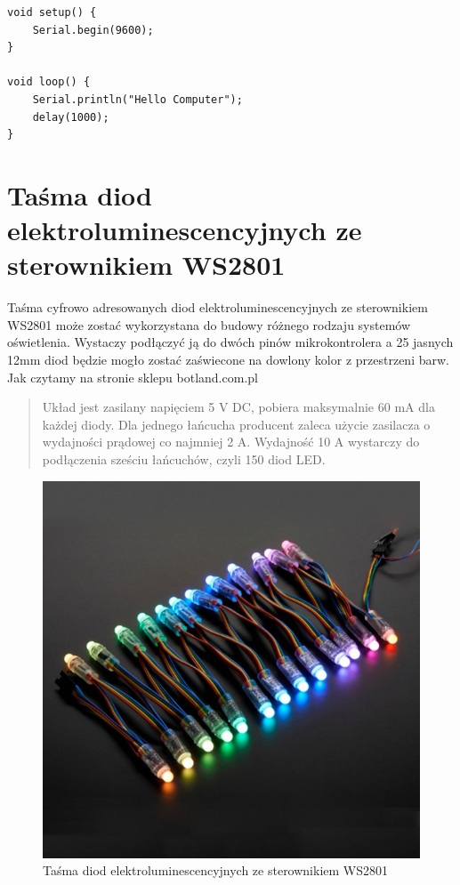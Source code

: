 \documentclass[12pt]{report}
\begin{document}
\begin{lstlisting}[style=customarduino,caption=Kod wysyłający co sekundę wiadomość powitalną do komputera za pomocą interfejsu portu szeregowego]
void setup() {
	Serial.begin(9600);
}

void loop() {
	Serial.println("Hello Computer");
	delay(1000);
}
\end{lstlisting}

\section{Taśma diod elektroluminescencyjnych ze sterownikiem WS2801}

Taśma cyfrowo adresowanych diod elektroluminescencyjnych ze sterownikiem WS2801 może zostać wykorzystana do budowy różnego rodzaju systemów oświetlenia. Wystaczy podłączyć ją do dwóch pinów mikrokontrolera a 25 jasnych 12mm diod będzie mogło zostać zaświecone na dowlony kolor z przestrzeni barw. Jak czytamy na stronie sklepu botland.com.pl \cite{ledb}

\begin{quote}
	Układ jest zasilany napięciem 5 V DC, pobiera maksymalnie 60 mA dla każdej diody. Dla jednego łańcucha producent zaleca użycie zasilacza o wydajności prądowej co najmniej 2 A. Wydajność 10 A wystarczy do podłączenia sześciu łańcuchów, czyli 150 diod LED.
\end{quote}

\begin{figure}[h]
\centering
\includegraphics[width=.7\textwidth]{../resources/led.jpg}
\caption{Taśma diod elektroluminescencyjnych ze sterownikiem WS2801 \cite{ledb}}
\end{figure}
\end{document}
